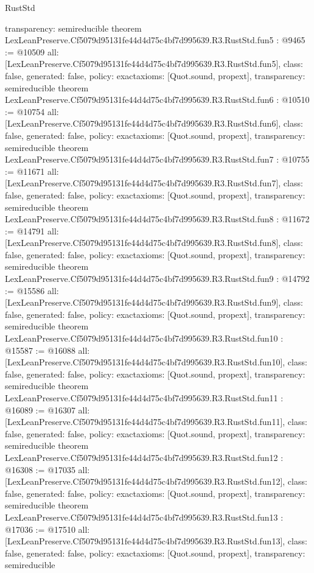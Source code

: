 \begin{lexlean}{RustStd}
\begin{coremodule}
{  transparency: semireducible
}
theorem LexLeanPreserve.Cf5079d95131fe44d4d75c4bf7d995639.R3.RustStd.fun5 : @9465 := @10509 {
  all: [LexLeanPreserve.Cf5079d95131fe44d4d75c4bf7d995639.R3.RustStd.fun5],
  class: false,
  generated: false,
  policy: exact{axioms: [Quot.sound, propext]},
  transparency: semireducible
}
theorem LexLeanPreserve.Cf5079d95131fe44d4d75c4bf7d995639.R3.RustStd.fun6 : @10510 := @10754 {
  all: [LexLeanPreserve.Cf5079d95131fe44d4d75c4bf7d995639.R3.RustStd.fun6],
  class: false,
  generated: false,
  policy: exact{axioms: [Quot.sound, propext]},
  transparency: semireducible
}
theorem LexLeanPreserve.Cf5079d95131fe44d4d75c4bf7d995639.R3.RustStd.fun7 : @10755 := @11671 {
  all: [LexLeanPreserve.Cf5079d95131fe44d4d75c4bf7d995639.R3.RustStd.fun7],
  class: false,
  generated: false,
  policy: exact{axioms: [Quot.sound, propext]},
  transparency: semireducible
}
theorem LexLeanPreserve.Cf5079d95131fe44d4d75c4bf7d995639.R3.RustStd.fun8 : @11672 := @14791 {
  all: [LexLeanPreserve.Cf5079d95131fe44d4d75c4bf7d995639.R3.RustStd.fun8],
  class: false,
  generated: false,
  policy: exact{axioms: [Quot.sound, propext]},
  transparency: semireducible
}
theorem LexLeanPreserve.Cf5079d95131fe44d4d75c4bf7d995639.R3.RustStd.fun9 : @14792 := @15586 {
  all: [LexLeanPreserve.Cf5079d95131fe44d4d75c4bf7d995639.R3.RustStd.fun9],
  class: false,
  generated: false,
  policy: exact{axioms: [Quot.sound, propext]},
  transparency: semireducible
}
theorem LexLeanPreserve.Cf5079d95131fe44d4d75c4bf7d995639.R3.RustStd.fun10 : @15587 := @16088 {
  all: [LexLeanPreserve.Cf5079d95131fe44d4d75c4bf7d995639.R3.RustStd.fun10],
  class: false,
  generated: false,
  policy: exact{axioms: [Quot.sound, propext]},
  transparency: semireducible
}
theorem LexLeanPreserve.Cf5079d95131fe44d4d75c4bf7d995639.R3.RustStd.fun11 : @16089 := @16307 {
  all: [LexLeanPreserve.Cf5079d95131fe44d4d75c4bf7d995639.R3.RustStd.fun11],
  class: false,
  generated: false,
  policy: exact{axioms: [Quot.sound, propext]},
  transparency: semireducible
}
theorem LexLeanPreserve.Cf5079d95131fe44d4d75c4bf7d995639.R3.RustStd.fun12 : @16308 := @17035 {
  all: [LexLeanPreserve.Cf5079d95131fe44d4d75c4bf7d995639.R3.RustStd.fun12],
  class: false,
  generated: false,
  policy: exact{axioms: [Quot.sound, propext]},
  transparency: semireducible
}
theorem LexLeanPreserve.Cf5079d95131fe44d4d75c4bf7d995639.R3.RustStd.fun13 : @17036 := @17510 {
  all: [LexLeanPreserve.Cf5079d95131fe44d4d75c4bf7d995639.R3.RustStd.fun13],
  class: false,
  generated: false,
  policy: exact{axioms: [Quot.sound, propext]},
  transparency: semireducible
}
\end{coremodule}
\end{lexlean}
